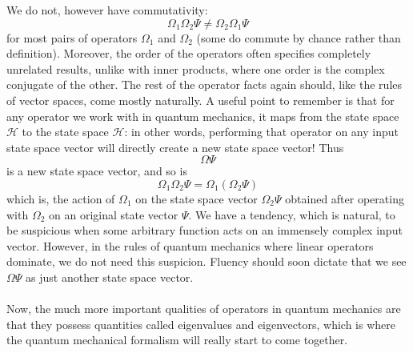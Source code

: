 We do not, however have commutativity:
$$
\Omega_{1}\Omega_{2}\Psi\neq\Omega_{2}\Omega_{1}\Psi
$$
for most pairs of operators $\Omega_{1}$ and $\Omega_{2}$ (some do commute by chance rather than definition). Moreover, the order of the operators often specifies completely unrelated results, unlike with inner products, where one order is the complex conjugate of the other. The rest of the operator facts again should, like the rules of vector spaces, come mostly naturally. A useful point to remember is that for any operator we work with in quantum mechanics, it maps from the state space $\mathscr{H}$ to the state space $\mathscr{H}$: in other words, performing that operator on any input state space vector will directly create a new state space vector! Thus 
$$
\Omega\Psi
$$
is a new state space vector, and so is
$$
\Omega_{1}\Omega_{2}\Psi=\Omega_{1}(\Omega_{2}\Psi)
$$
which is, the action of $\Omega_{1}$ on the state space vector $\Omega_{2}\Psi$ obtained after operating with $\Omega_{2}$ on an original state vector $\Psi$. We have a tendency, which is natural, to be suspicious when some arbitrary function acts on an immensely complex input vector. However, in the rules of quantum mechanics where linear operators dominate, we do not need this suspicion. Fluency should soon dictate that we see $\Omega\Psi$
as just another state space vector.
\\\\
Now, the much more important qualities of operators in quantum mechanics are that they possess quantities called eigenvalues and eigenvectors, which is where the quantum mechanical formalism will really start to come together.
